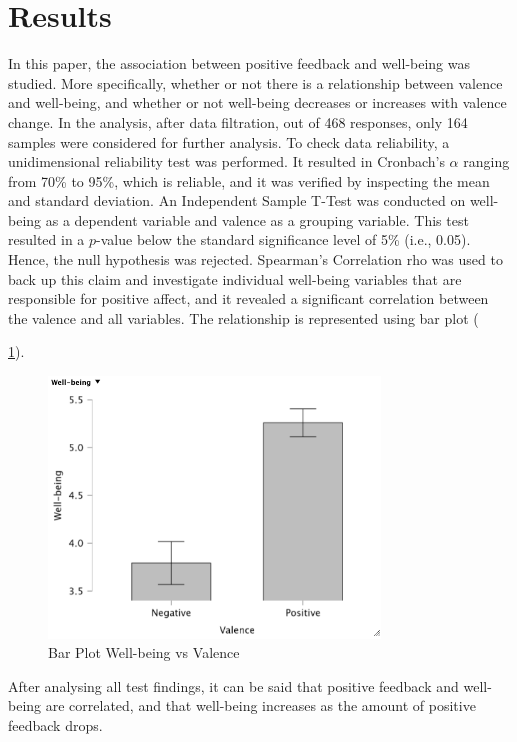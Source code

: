 \documentclass[conference]{IEEEtran}
\begin{document}
\section[H]{Results}
	In this paper, the association between positive feedback and well-being was studied. More specifically, whether or not there is a relationship between valence and well-being, and whether or not well-being decreases or increases with valence change. In the analysis, after data filtration, out of 468 responses, only 164 samples were considered for further analysis. To check data reliability, a unidimensional reliability test was performed. It resulted in Cronbach’s $\alpha$ ranging from 70\% to 95\%, which is reliable, and it was verified by inspecting the mean and standard deviation. An Independent Sample T-Test was conducted on well-being as a dependent variable and valence as a grouping variable. This test resulted in a $p$-value below the standard significance level of 5\% (i.e., 0.05). Hence, the null hypothesis was rejected. Spearman's Correlation rho was used to back up this claim and investigate individual well-being variables that are responsible for positive affect, and it revealed a significant correlation between the valence and all variables. The relationship is represented using bar plot (\figurename{\ref{Bar Plot}).\\
		
	\begin{figure}[H]
	\centerline{\includegraphics[width=88mm,scale=1]{Bar Plot.png}}
	\caption{Bar Plot Well-being vs Valence}
	\label{Bar Plot}
	\end{figure}
	
	After analysing all test findings, it can be said that positive feedback and well-being are correlated, and that well-being increases as the amount of positive feedback drops. 

}
\end{document}
